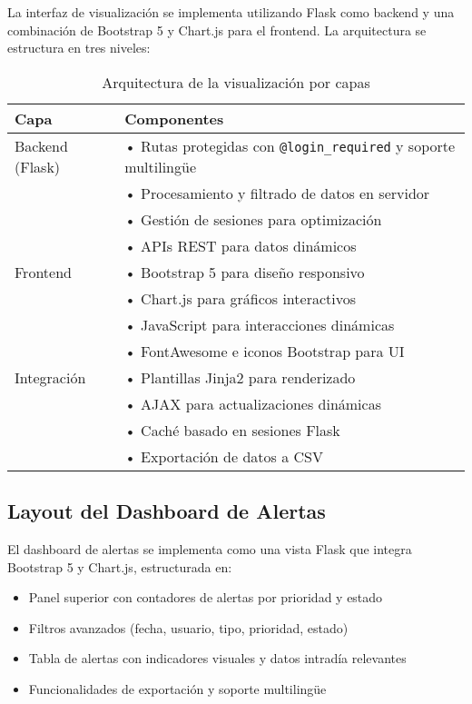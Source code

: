 La interfaz de visualización se implementa utilizando Flask como backend y una combinación de Bootstrap 5 y Chart.js para el frontend. La arquitectura se estructura en tres niveles:
\begin{table}[htbp]
    \centering
    \begin{tabular}{|l|l|}
        \hline
        \textbf{Capa} & \textbf{Componentes} \\
        \hline
        Backend (Flask) & • Rutas protegidas con \texttt{@login\_required} y soporte multilingüe \\
        & • Procesamiento y filtrado de datos en servidor \\
        & • Gestión de sesiones para optimización \\
        & • APIs REST para datos dinámicos \\
        \hline
        Frontend & • Bootstrap 5 para diseño responsivo \\
        & • Chart.js para gráficos interactivos \\
        & • JavaScript para interacciones dinámicas \\
        & • FontAwesome e iconos Bootstrap para UI \\
        \hline
        Integración & • Plantillas Jinja2 para renderizado \\
        & • AJAX para actualizaciones dinámicas \\
        & • Caché basado en sesiones Flask \\
        & • Exportación de datos a CSV \\
        \hline
    \end{tabular}
    \caption{Arquitectura de la visualización por capas}
    \label{tab:arquitectura_visualizacion}
\end{table}

\subsection{Layout del Dashboard de Alertas}
\label{subsec:layout_dashboard}

El dashboard de alertas se implementa como una vista Flask que integra Bootstrap 5 y Chart.js, estructurada en:

\begin{itemize}
    \item Panel superior con contadores de alertas por prioridad y estado
    \item Filtros avanzados (fecha, usuario, tipo, prioridad, estado)
    \item Tabla de alertas con indicadores visuales y datos intradía relevantes
    \item Funcionalidades de exportación y soporte multilingüe
\end{itemize}

